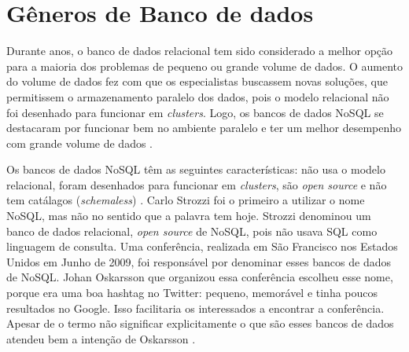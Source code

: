 \section{Gêneros de Banco de dados}
\label{sec:databasetype}
Durante anos, o banco de dados relacional tem sido considerado a melhor opção para a maioria dos problemas de pequeno ou grande volume de dados. O aumento do volume de dados fez com que os especialistas buscassem novas soluções, que permitissem o armazenamento paralelo dos dados, pois o modelo relacional não foi desenhado para funcionar em \textit{clusters}. Logo, os bancos de dados NoSQL se destacaram por funcionar bem no ambiente paralelo e ter um melhor desempenho com grande volume de dados \cite{NoSQL}.

Os bancos de dados NoSQL têm as seguintes características: não usa o modelo relacional, foram desenhados para funcionar em \textit{clusters}, são \textit{open source} e não tem catálagos (\textit{schemaless}) \cite{NoSQL}. Carlo Strozzi foi o primeiro a utilizar o nome NoSQL, mas não no sentido que a palavra tem hoje. Strozzi denominou um banco de dados relacional, \textit{open source} de NoSQL, pois não usava \ac{SQL} como linguagem de consulta. Uma conferência, realizada em São Francisco nos Estados Unidos em Junho de 2009, foi responsável por denominar esses bancos de dados de NoSQL. Johan Oskarsson que organizou essa conferência escolheu esse nome, porque era uma boa hashtag no Twitter: pequeno, memorável e tinha poucos resultados no Google. Isso facilitaria os interessados a encontrar a conferência. Apesar de o termo não significar explicitamente o que são esses bancos de dados atendeu bem a intenção de Oskarsson \cite{NoSQL}.



